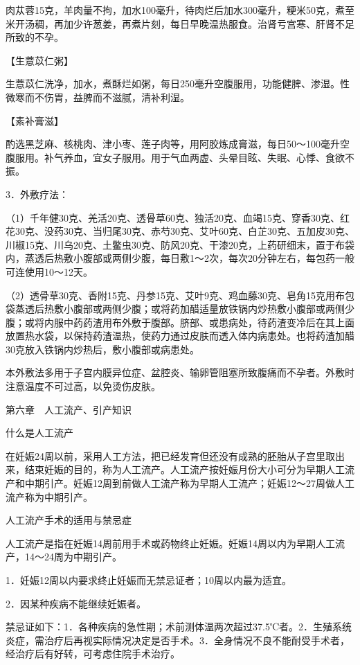 \documentclass[12pt,UTF8]{ctexbook}
\begin{document}
肉苁蓉15克，羊肉量不拘，加水100毫升，待肉烂后加水300毫升，粳米50克，煮至米开汤稠，再加少许葱姜，再煮片刻，每日早晚温热服食。治肾亏宫寒、肝肾不足所致的不孕。

【生薏苡仁粥】

生薏苡仁洗净，加水，煮酥烂如粥，每日250毫升空腹服用，功能健脾、渗湿。性微寒而不伤胃，益脾而不滋腻，清补利湿。

【素补膏滋】

酌选黑芝麻、核桃肉、津小枣、莲子肉等，用阿胶炼成膏滋，每日50～100毫升空腹服用。补气养血，宜女子服用。用于气血两虚、头晕目眩、失眠、心悸、食欲不振。

3．外敷疗法：

（1）千年健30克、羌活20克、透骨草60克、独活20克、血竭15克、穿香30克、红花30克、没药30克、当归尾30克、赤芍30克、艾叶60克、白芷30克、五加皮30克、川椒15克、川乌20克、土鳖虫30克、防风20克、干漆20克，上药研细末，置于布袋内，蒸透后热敷小腹部或两侧少腹，每日敷1～2次，每次20分钟左右，每包药一般可连使用10～12天。

（2）透骨草30克、香附15克、丹参15克、艾叶9克、鸡血藤30克、皂角15克用布包袋蒸透后热敷小腹部或两侧少腹；或将药加醋适量放铁锅内炒热敷小腹部或两侧少腹；或将内服中药药渣用布外敷于腹部。脐部、或患病处，待药渣变冷后在其上面放置热水袋，以保持药渣温热，使药力通过皮肤而透入体内病患处。也将药渣加醋30克放入铁锅内炒热后，敷小腹部或病患处。

本外敷法多用于子宫内膜异位症、盆腔炎、输卵管阻塞所致腹痛而不孕者。外敷时注意温度不可过高，以免烫伤皮肤。





第六章　人工流产、引产知识


什么是人工流产


在妊娠24周以前，采用人工方法，把已经发育但还没有成熟的胚胎从子宫里取出来，结束妊娠的目的，称为人工流产。人工流产按妊娠月份大小可分为早期人工流产和中期引产。妊娠12周到前做人工流产称为早期人工流产；妊娠12～27周做人工流产称为中期引产。





人工流产手术的适用与禁忌症


人工流产是指在妊娠14周前用手术或药物终止妊娠。妊娠14周以内为早期人工流产，14～24周为中期引产。

1．妊娠12周以内要求终止妊娠而无禁忌证者；10周以内最为适宜。

2．因某种疾病不能继续妊娠者。

禁忌证如下：1．各种疾病的急性期；术前测体温两次超过37.5℃者。2．生殖系统炎症，需治疗后再视实际情况决定是否手术。3．全身情况不良不能耐受手术者，经治疗后有好转，可考虑住院手术治疗。
\end{document}
